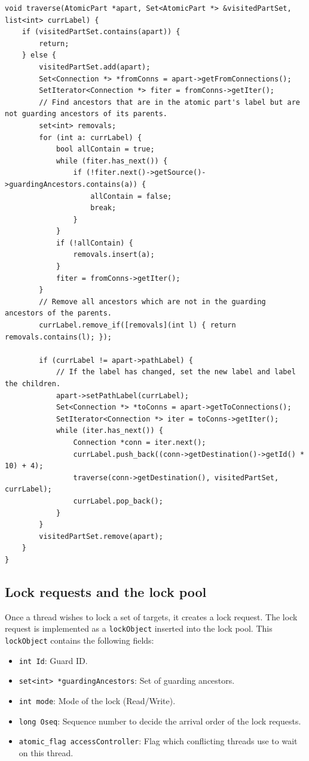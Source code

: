 \begin{lstlisting}[caption={Labelling an atomic part},label={lst:traverseAP}]
void traverse(AtomicPart *apart, Set<AtomicPart *> &visitedPartSet, list<int> currLabel) {
    if (visitedPartSet.contains(apart)) {
        return;
    } else {
        visitedPartSet.add(apart);
        Set<Connection *> *fromConns = apart->getFromConnections();
        SetIterator<Connection *> fiter = fromConns->getIter();
        // Find ancestors that are in the atomic part's label but are not guarding ancestors of its parents.
        set<int> removals;
        for (int a: currLabel) {
            bool allContain = true;
            while (fiter.has_next()) {
                if (!fiter.next()->getSource()->guardingAncestors.contains(a)) {
                    allContain = false;
                    break;
                }
            }
            if (!allContain) {
                removals.insert(a);
            }
            fiter = fromConns->getIter();
        }
        // Remove all ancestors which are not in the guarding ancestors of the parents.
        currLabel.remove_if([removals](int l) { return removals.contains(l); });

        if (currLabel != apart->pathLabel) {
            // If the label has changed, set the new label and label the children.
            apart->setPathLabel(currLabel);
            Set<Connection *> *toConns = apart->getToConnections();
            SetIterator<Connection *> iter = toConns->getIter();
            while (iter.has_next()) {
                Connection *conn = iter.next();
                currLabel.push_back((conn->getDestination()->getId() * 10) + 4);
                traverse(conn->getDestination(), visitedPartSet, currLabel);
                currLabel.pop_back();
            }
        }
        visitedPartSet.remove(apart);
    }
}
\end{lstlisting}




\subsection{Lock requests and the lock pool}

Once a thread wishes to lock a set of targets, it creates a lock request. The lock request is implemented as a \texttt{lockObject} inserted into the lock pool. This \texttt{lockObject} contains the following fields:

\begin{itemize}
    \item \texttt{int Id}: Guard ID.
    \item \texttt{set<int> *guardingAncestors}: Set of guarding ancestors.
    \item \texttt{int mode}: Mode of the lock (Read/Write).
    \item \texttt{long Oseq}: Sequence number to decide the arrival order of the lock requests.
    \item \texttt{atomic\_flag accessController}: Flag which conflicting threads use to wait on this thread.
\end{itemize}

